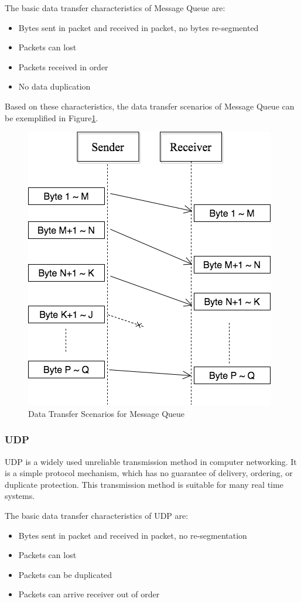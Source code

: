 The basic data transfer characteristics of Message Queue are:
\begin{itemize}
  \item Bytes sent in packet and received in packet, no bytes re-segmented
  \item Packets can lost
  \item Packets received in order
  \item No data duplication
\end{itemize}
Based on these characteristics, the data transfer scenarios of Message Queue can be exemplified in Figure\ref{msmq}.
\begin{figure}[H]
\centerline{\includegraphics[scale=0.48]{Figures/msmq}}
\caption{Data Transfer Scenarios for Message Queue}
\label{msmq}
\end{figure}


\subsubsection{UDP}\label{udp}
UDP is a widely used unreliable transmission method in computer networking. It is a simple protocol mechanism, which has no guarantee of delivery, ordering, or duplicate protection. This transmission method is suitable for many real time systems. 

The basic data transfer characteristics of UDP are:
\begin{itemize}
  \item Bytes sent in packet and received in packet, no re-segmentation
  \item Packets can lost
  \item Packets can be duplicated
  \item Packets can arrive receiver out of order
\end{itemize}

